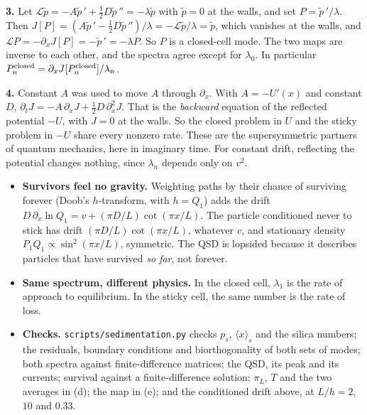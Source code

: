 \documentclass[11pt]{article}
\newcommand{\avg}[1]{\langle #1\rangle}
\newcommand{\exsec}[1]{\par\vspace{6pt}{\sffamily\bfseries\large\color{PineGreen}#1}\par\vspace{-2pt}}
\begin{document}
\textbf{3.} Let $\mathcal L\tilde p=-A\tilde p\,'+\frac12D\tilde p\,''=-\lambda\tilde p$ with $\tilde p=0$ at the
walls, and set $P=\tilde p\,'/\lambda$. Then $J[P]=(A\tilde p\,'-\frac12D\tilde p\,'')/\lambda=-\mathcal L\tilde
p/\lambda=\tilde p$, which vanishes at the walls, and $\mathcal LP=-\partial_xJ[P]=-\tilde p\,'=-\lambda P$. So
$P$ is a closed-cell mode. The two maps are inverse to each other, and the spectra agree except for $\lambda_0$.
In particular $P_n^{\rm closed}=\partial_xJ[P_n^{\rm closed}]/\lambda_n$.

\textbf{4.} Constant $A$ was used to move $A$ through $\partial_x$. With $A=-U'(x)$ and constant $D$,
$\partial_tJ=-A\,\partial_xJ+\frac12D\,\partial_x^2J$. That is the \emph{backward} equation of the reflected
potential $-U$, with $J=0$ at the walls. So the closed problem in $U$ and the sticky problem in $-U$ share every
nonzero rate. These are the supersymmetric partners of quantum mechanics, here in imaginary time. For constant
drift, reflecting the potential changes nothing, since $\lambda_n$ depends only on $v^2$.

\exsec{For the discussion}
\begin{itemize}
  \item \textbf{Survivors feel no gravity.} Weighting paths by their chance of surviving forever (Doob's
        $h$-transform, with $h=Q_1$) adds the drift $D\,\partial_x\ln Q_1=v+(\pi D/L)\cot(\pi x/L)$. The particle
        conditioned never to stick has drift $(\pi D/L)\cot(\pi x/L)$, whatever $v$, and stationary density
        $P_1Q_1\propto\sin^2(\pi x/L)$, symmetric. The QSD is lopsided because it describes particles that have
        survived \emph{so far}, not forever.
  \item \textbf{Same spectrum, different physics.} In the closed cell, $\lambda_1$ is the rate of approach to
        equilibrium. In the sticky cell, the same number is the rate of loss.
  \item \textbf{Checks.} \texttt{scripts/sedimentation.py} checks $p_s$, $\avg x_s$ and the silica numbers; the
        residuals, boundary conditions and biorthogonality of both sets of modes; both spectra against
        finite-difference matrices; the QSD, its peak and its currents; survival against a finite-difference
        solution; $\pi_L$, $T$ and the two averages in (d); the map in (e); and the conditioned drift above, at
        $L/h=2$, $10$ and $0.33$.
\end{itemize}
\end{document}
